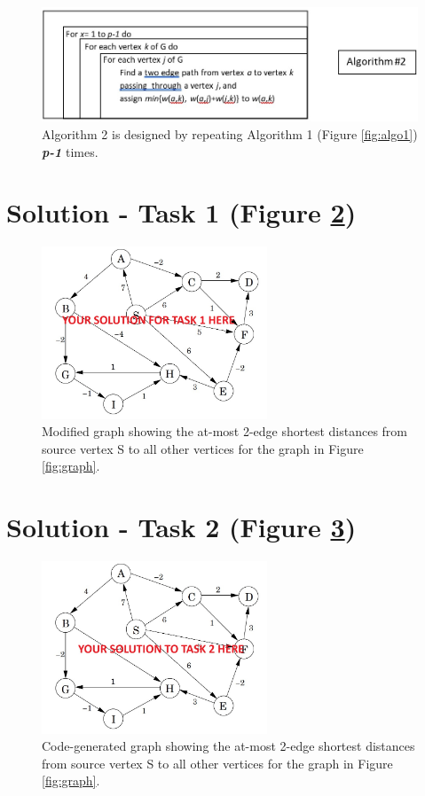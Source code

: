\documentclass[a4paper]{article}
\begin{document}
\begin{figure}[h!]
    \begin{minipage}{0.9\textwidth}
        \centering
        \includegraphics[width=\textwidth]{algo2.jpg}
        \caption{Algorithm 2 is designed by repeating Algorithm 1 (Figure \ref{fig:algo1}) \textbf{\textit{p-1}} times.}
        \label{fig:algo2}
    \end{minipage}
\end{figure}

\clearpage
\section*{Solution - Task 1 (Figure \ref{fig:graph-task1})}
\begin{figure}[h!]
    \centering
    \includegraphics[width=0.6\textwidth]{graph-task1.jpg}
    \caption{Modified graph showing the at-most 2-edge shortest distances from source vertex S to all other vertices for the graph in Figure \ref{fig:graph}.}
    \label{fig:graph-task1}
\end{figure}

\clearpage
\section*{Solution - Task 2 (Figure \ref{fig:graph-task2})}
\begin{figure}[h!]
    \centering
    \includegraphics[width=0.6\textwidth]{graph-task2.jpg}
    \caption{Code-generated graph showing the at-most 2-edge shortest distances from source vertex S to all other vertices for the graph in Figure \ref{fig:graph}.}
    \label{fig:graph-task2}
\end{figure}
\end{document}
